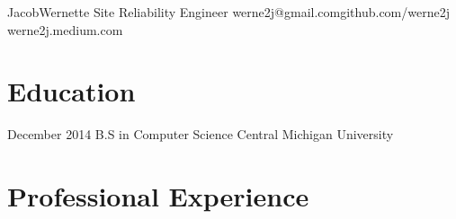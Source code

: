 \documentclass[]{friggeri-cv} %
\begin{document}
\header
{Jacob}{Wernette}
{Site Reliability Engineer}
{werne2j@gmail.com\space\space\space\space\space\space github.com/werne2j \space\space\space\space\space werne2j.medium.com}




\section{Education}

\begin{entrylist}
\entry
{December 2014}
{B.S in Computer Science{\normalfont}}
{Central Michigan University}

\end{entrylist}


\section{Professional Experience}
\end{document}
